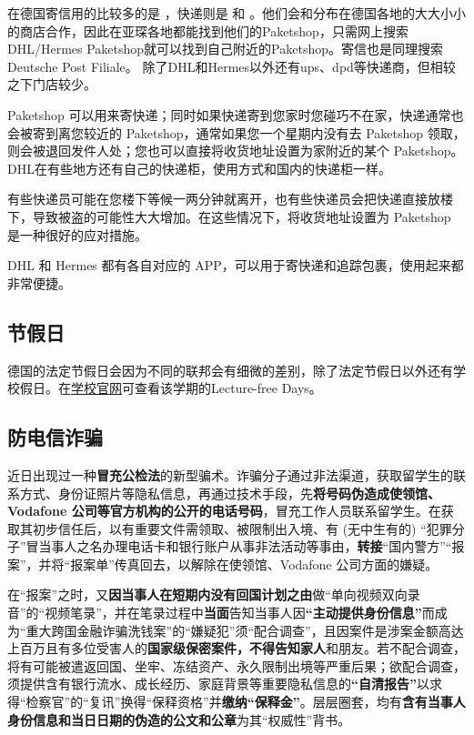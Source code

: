     在德国寄信用的比较多的是 \href{https://www.deutschepost.de/de.html}{}，快递则是 \href{https://www.dhl.de/de/privatkunden.html}{} 和 \href{https://www.myhermes.de/}{}。他们会和分布在德国各地的大大小小的商店合作，因此在亚琛各地都能找到他们的Paketshop，只需网上搜索DHL/Hermes Paketshop就可以找到自己附近的Paketshop。寄信也是同理搜索Deutsche Post Filiale。 除了DHL和Hermes以外还有ups、dpd等快递商，但相较之下门店较少。

    Paketshop 可以用来寄快递；同时如果快递寄到您家时您碰巧不在家，快递通常也会被寄到离您较近的 Paketshop，通常如果您一个星期内没有去 Paketshop 领取，则会被退回发件人处；您也可以直接将收货地址设置为家附近的某个 Paketshop。DHL在有些地方还有自己的快递柜，使用方式和国内的快递柜一样。

    有些快递员可能在您楼下等候一两分钟就离开，也有些快递员会把快递直接放楼下，导致被盗的可能性大大增加。在这些情况下，将收货地址设置为 Paketshop 是一种很好的应对措施。

    DHL 和 Hermes 都有各自对应的 APP，可以用于寄快递和追踪包裹，使用起来都非常便捷。

  \subsection{节假日}\label{subsec:节假日}

    德国的法定节假日会因为不同的联邦会有细微的差别，除了法定节假日以外还有学校假日。在\href{https://www.rwth-aachen.de/cms/root/Studium/Im-Studium/~egv/Semestertermine/lidx/1/}{学校官网}可查看该学期的Lecture-free Days。

  \subsection{防电信诈骗}\label{subsec:防电信诈骗}

    近日出现过一种\textbf{冒充公检法}的新型骗术。诈骗分子通过非法渠道，获取留学生的联系方式、身份证照片等隐私信息，再通过技术手段，先\textbf{将号码伪造成使领馆、Vodafone 公司等官方机构的公开的电话号码}，冒充工作人员联系留学生。在获取其初步信任后，以有重要文件需领取、被限制出入境、有 (无中生有的) ``犯罪分子''冒当事人之名办理电话卡和银行账户从事非法活动等事由，\textbf{转接}``国内警方''``报案''，并将``报案单''传真回去，以解除在使领馆、Vodafone 公司方面的嫌疑。

    在``报案''之时，又\textbf{因当事人在短期内没有回国计划之由}做``单向视频双向录音''的``视频笔录''，并在笔录过程中\textbf{当面}告知当事人因\textbf{``主动提供身份信息''}而成为``重大跨国金融诈骗洗钱案''的``嫌疑犯''须``配合调查''，且因案件是涉案金额高达上百万且有多位受害人的\textbf{国家级保密案件，不得告知家人}和朋友。若不配合调查，将有可能被遣返回国、坐牢、冻结资产、永久限制出境等严重后果；欲配合调查，须提供含有银行流水、成长经历、家庭背景等重要隐私信息的\textbf{``自清报告''}以求得``检察官''的``复讯''换得``保释资格''并\textbf{缴纳``保释金''}。层层圈套，均有\textbf{含有当事人身份信息和当日日期的伪造的公文和公章}为其``权威性''背书。

